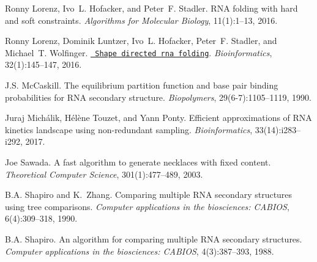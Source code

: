 \begin{DoxyDescription}
\item[\label{citelist_CITEREF_lorenz:2016b}%
\Hypertarget{citelist_CITEREF_lorenz:2016b}%
\mbox{[}15\mbox{]}]Ronny Lorenz, Ivo~L. Hofacker, and Peter~F. Stadler. R\+NA folding with hard and soft constraints. {\itshape Algorithms for Molecular Biology}, 11(1)\+:1--13, 2016. 


\item[\label{citelist_CITEREF_lorenz:2016a}%
\Hypertarget{citelist_CITEREF_lorenz:2016a}%
\mbox{[}16\mbox{]}]Ronny Lorenz, Dominik Luntzer, Ivo~L. Hofacker, Peter~F. Stadler, and Michael~T. Wolfinger. \href{http://bioinformatics.oxfordjournals.org/content/32/1/145.abstract}{\texttt{ Shape directed rna folding}}. {\itshape Bioinformatics}, 32(1)\+:145--147, 2016. 


\item[\label{citelist_CITEREF_mccaskill:1990}%
\Hypertarget{citelist_CITEREF_mccaskill:1990}%
\mbox{[}17\mbox{]}]J.\+S. Mc\+Caskill. The equilibrium partition function and base pair binding probabilities for R\+NA secondary structure. {\itshape Biopolymers}, 29(6-\/7)\+:1105--1119, 1990.


\item[\label{citelist_CITEREF_michalik:2017}%
\Hypertarget{citelist_CITEREF_michalik:2017}%
\mbox{[}18\mbox{]}]Juraj Mich\'{a}lik, H\'{e}l\`{e}ne Touzet, and Yann Ponty. Efficient approximations of R\+NA kinetics landscape using non-\/redundant sampling. {\itshape Bioinformatics}, 33(14)\+:i283--i292, 2017.


\item[\label{citelist_CITEREF_sawada:2003}%
\Hypertarget{citelist_CITEREF_sawada:2003}%
\mbox{[}19\mbox{]}]Joe Sawada. A fast algorithm to generate necklaces with fixed content. {\itshape Theoretical Computer Science}, 301(1)\+:477--489, 2003.


\item[\label{citelist_CITEREF_shapiro:1990}%
\Hypertarget{citelist_CITEREF_shapiro:1990}%
\mbox{[}20\mbox{]}]B.\+A. Shapiro and K.~Zhang. Comparing multiple R\+NA secondary structures using tree comparisons. {\itshape Computer applications in the biosciences\+: C\+A\+B\+I\+OS}, 6(4)\+:309--318, 1990.


\item[\label{citelist_CITEREF_shapiro:1988}%
\Hypertarget{citelist_CITEREF_shapiro:1988}%
\mbox{[}21\mbox{]}]B.\+A. Shapiro. An algorithm for comparing multiple R\+NA secondary structures. {\itshape Computer applications in the biosciences\+: C\+A\+B\+I\+OS}, 4(3)\+:387--393, 1988.



\end{DoxyDescription}
